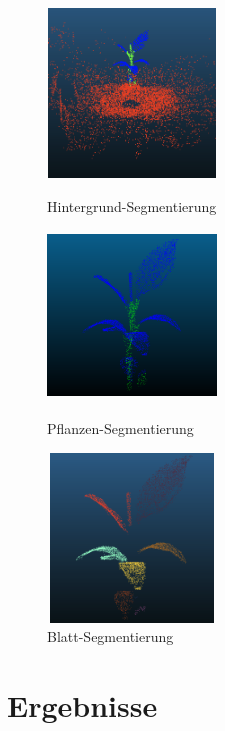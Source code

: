 \documentclass[12pt,titlepage, twoside]{article}
\begin{document}
\begin{figure}
    \centering
    \begin{minipage}{0.3\textwidth}
        \centering
        \includegraphics[height=4.5cm,width=4.5cm]{./Images/PipelineBackgroundSegmentationStriped.png}
        \caption{Hintergrund-Segmentierung}
        \label{fig:PiplineBackgroundSegmentation}
    \end{minipage}\hfill
    \begin{minipage}{0.3\textwidth}
        \centering
        \includegraphics[height=4.5cm,width=4.5cm]{./Images/PipelinePlantSegmentation.png}
        \caption{Pflanzen-Segmentierung}
        \label{fig:PipelinePlantSegmentation}
    \end{minipage}\hfill
    \begin{minipage}{0.3\textwidth}
        \centering
        \includegraphics[height=4.5cm,width=4.5cm]{./Images/PipelineLeaveSegmentationStriped.png}
        \caption{Blatt-Segmentierung}
        \label{fig:PipelineLeaveSegmentation}
    \end{minipage}
\end{figure}

\newpage
\section{Ergebnisse}
\label{sec:ergebnisse}
%
\end{document}
